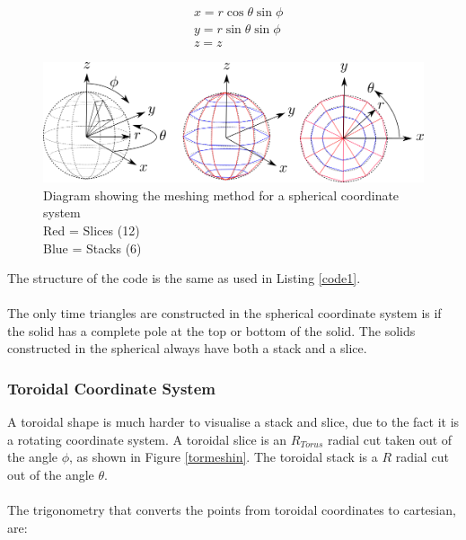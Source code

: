 \documentclass[12pt,a4paper]{article}
\begin{document}
\begin{equation}
\begin{aligned}
& x = r \cos{\theta}\sin{\phi}\\
& y = r \sin{\theta}\sin{\phi} \\
& z = z
\end{aligned}
\label{trigsph}
\end{equation}
\begin{figure}[h!]
\centering
\includegraphics[scale=0.5]{Images//Coords//sph.png}
\caption[width=\columnwidth]{Diagram showing the meshing method for a spherical coordinate system\\
Red = Slices (12)\\
Blue = Stacks (6)}
\label{sphmeshin}
\end{figure}

\noindent The structure of the code is the same as used in Listing \ref{code1}.\\\\
\noindent The only time triangles are constructed in the spherical coordinate system is if the solid has a complete pole at the top or bottom of the solid. The solids constructed in the spherical always have both a stack and a slice.

%

\newpage
\subsubsection{Toroidal Coordinate System}

A toroidal shape is much harder to visualise a stack and slice, due to the fact it is a rotating coordinate system. A toroidal slice is an $R_{Torus}$ radial cut taken out of the angle $\phi$, as shown in Figure \ref{tormeshin}. The toroidal stack is a $R$ radial cut out of the angle $\theta$. 
\\\\
The trigonometry that converts the points from toroidal coordinates to cartesian, are:
\end{document}

